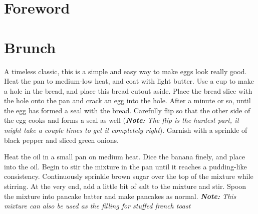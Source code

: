 \documentclass[oneside]{recipe}
\begin{document}
\tableofcontents
\chapter{Foreword}


\chapter{Brunch}

A timeless classic, this is a simple and easy way to make eggs look really good. Heat the pan to medium-low heat, and coat with light butter. Use a cup to make a hole in the bread, and place this bread cutout aside. Place the bread slice with the hole onto the pan and crack an egg into the hole. After a minute or so, until the egg has formed a seal with the bread. Carefully flip so that the other side of the egg cooks and forms a seal as well (\textit{\textbf{Note: } The flip is the hardest part, it might take a couple times to get it completely right}). Garnish with a sprinkle of black pepper and sliced green onions. 





Heat the oil in a small pan on medium heat. Dice the banana finely, and place into the oil. Begin to stir the mixture in the pan until it reaches a pudding-like consistency. 
Continuously sprinkle brown sugar over the top of the mixture while stirring. At the very end, add a little bit of salt to the mixture and stir. Spoon the mixture into pancake batter and make pancakes as normal. \textit{\textbf{Note:} This mixture can also be used as the filling for stuffed french toast}



\end{document}
